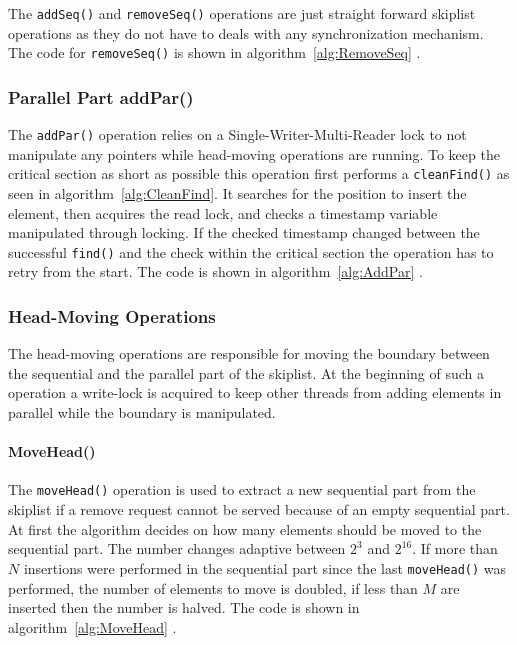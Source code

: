 The \texttt{addSeq()} and \texttt{removeSeq()} operations are just straight forward skiplist operations as they do not have to deals with any synchronization mechanism. The code for \texttt{removeSeq()} is shown in algorithm~\ref{alg:RemoveSeq} \cite{calciu_adaptive_2014}.

\subsubsection{Parallel Part addPar()}

The \texttt{addPar()} operation relies on a Single-Writer-Multi-Reader lock to not manipulate any pointers while head-moving operations are running. To keep the critical section as short as possible this operation first performs a \texttt{cleanFind()} as seen in algorithm~\ref{alg:CleanFind}. It searches for the position to insert the element, then acquires the read lock, and checks a timestamp variable manipulated through locking. If the checked timestamp changed between the successful \texttt{find()} and the check within the critical section the operation has to retry from the start. The code is shown in algorithm~\ref{alg:AddPar} \cite{calciu_adaptive_2014}.

\subsubsection{Head-Moving Operations}

The head-moving operations are responsible for moving the boundary between the sequential and the parallel part of the skiplist. At the beginning of such a operation a write-lock is acquired to keep other threads from adding elements in parallel while the boundary is manipulated.

\paragraph{MoveHead()}

The \texttt{moveHead()} operation is used to extract a new sequential part from the skiplist if a remove request cannot be served because of an empty sequential part. At first the algorithm decides on how many elements should be moved to the sequential part. The number changes adaptive between $2^3$ and $2^{16}$. If more than $N$ insertions were performed in the sequential part since the last \texttt{moveHead()} was performed, the number of elements to move is doubled, if less than $M$ are inserted then the number is halved. The code is shown in algorithm~\ref{alg:MoveHead} \cite{calciu_adaptive_2014}.

